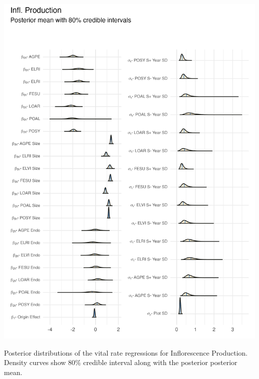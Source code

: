 \documentclass[lineno, sn-basic]{sn-jnl}%
\begin{document}
\begin{myfigure}[H]
	\centering
	\includegraphics[width = \linewidth]{fert_posteriors_plot.png}
	\caption[Posterior distributions of the vital rate regressions for Inflorescence Production]{Posterior distributions of the vital rate regressions for Inflorescence Production. Density curves show $80\%$ credible interval along with the posterior posterior mean.}
\end{myfigure}
\end{document}
